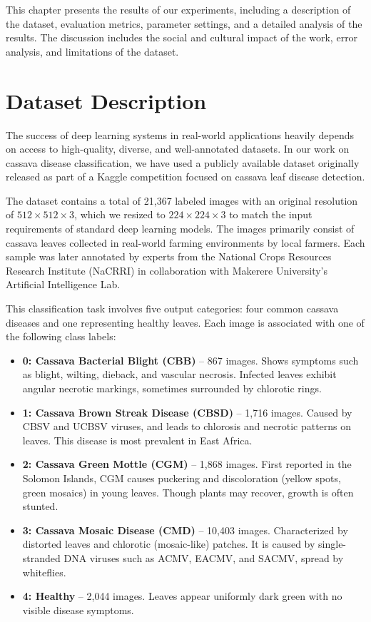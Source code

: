 
This chapter presents the results of our experiments, including a description of the dataset, evaluation metrics, parameter settings, and a detailed analysis of the results. The discussion includes the social and cultural impact of the work, error analysis, and limitations of the dataset.

\section{Dataset Description}

The success of deep learning systems in real-world applications heavily depends on access to high-quality, diverse, and well-annotated datasets. In our work on cassava disease classification, we have used a publicly available dataset originally released as part of a Kaggle competition focused on cassava leaf disease detection.

The dataset contains a total of 21,367 labeled images with an original resolution of $512 \times 512 \times 3$, which we resized to $224 \times 224 \times 3$ to match the input requirements of standard deep learning models. The images primarily consist of cassava leaves collected in real-world farming environments by local farmers. Each sample was later annotated by experts from the National Crops Resources Research Institute (NaCRRI) in collaboration with Makerere University's Artificial Intelligence Lab.

This classification task involves five output categories: four common cassava diseases and one representing healthy leaves. Each image is associated with one of the following class labels:

\begin{itemize}
    \item \textbf{0: Cassava Bacterial Blight (CBB)} – 867 images. Shows symptoms such as blight, wilting, dieback, and vascular necrosis. Infected leaves exhibit angular necrotic markings, sometimes surrounded by chlorotic rings.
    \item \textbf{1: Cassava Brown Streak Disease (CBSD)} – 1,716 images. Caused by CBSV and UCBSV viruses, and leads to chlorosis and necrotic patterns on leaves. This disease is most prevalent in East Africa.
    \item \textbf{2: Cassava Green Mottle (CGM)} – 1,868 images. First reported in the Solomon Islands, CGM causes puckering and discoloration (yellow spots, green mosaics) in young leaves. Though plants may recover, growth is often stunted.
    \item \textbf{3: Cassava Mosaic Disease (CMD)} – 10,403 images. Characterized by distorted leaves and chlorotic (mosaic-like) patches. It is caused by single-stranded DNA viruses such as ACMV, EACMV, and SACMV, spread by whiteflies.
    \item \textbf{4: Healthy} – 2,044 images. Leaves appear uniformly dark green with no visible disease symptoms.
\end{itemize}

